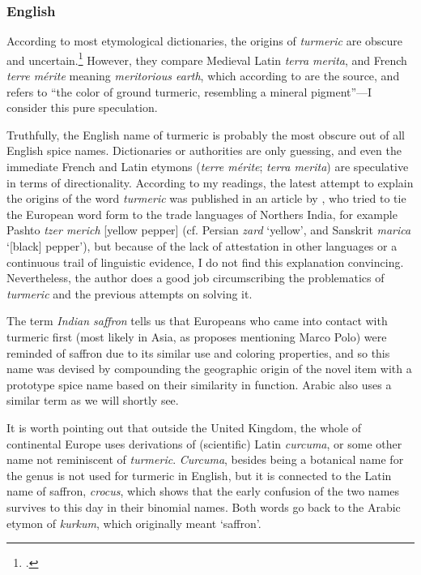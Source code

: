 \subsubsection{English}



According to most etymological dictionaries, the origins of \textit{turmeric} are obscure and uncertain.\footcites[turmeric]{oed}[turmeric]{oe}[turmeric]{ahd} However, they compare Medieval Latin \textit{terra merita}, and French \textit{terre mérite} meaning \textit{meritorious earth}, which according to \textcite[2]{nair_turmeric_2019} are the source, and refers to ``the color of ground turmeric, resembling a mineral pigment''---I consider this pure speculation. 

Truthfully, the English name of turmeric is probably the most obscure out of all English spice names. Dictionaries or authorities are only guessing, and even the immediate French and Latin etymons (\textit{terre mérite}; \textit{terra merita}) are speculative in terms of directionality. According to my readings, the latest attempt to explain the origins of the word \textit{turmeric} was published in an article by \textcite{guthrie_trade-language_2009}, who tried to tie the European word form to the trade languages of Northers India, for example Pashto \textit{tzer merich} [yellow pepper] (cf. Persian \textit{zard} `yellow', and Sanskrit \textit{marica} `[black] pepper'), but because of the lack of attestation in other languages or a continuous trail of linguistic evidence, I do not find this explanation convincing. Nevertheless, the author does a good job circumscribing the problematics of \textit{turmeric} and the previous attempts on solving it.

The term \textit{Indian saffron} tells us that Europeans who came into contact with turmeric first (most likely in Asia, as \textcite{nair_turmeric_2019} proposes mentioning Marco Polo) were reminded of saffron due to its similar use and coloring properties, and so this name was devised by compounding the geographic origin of the novel item with a prototype spice name based on their similarity in function. Arabic also uses a similar term as we will shortly see. 

It is worth pointing out that outside the United Kingdom, the whole of continental Europe uses derivations of (scientific) Latin \textit{curcuma}, or some other name not reminiscent of \textit{turmeric}. \textit{Curcuma}, besides being a botanical name for the genus is not used for turmeric in English, but it is connected to the Latin name of saffron, \textit{crocus}, which shows that the early confusion of the two names survives to this day in their binomial names. Both words go back to the Arabic etymon of \textit{kurkum}, which originally meant `saffron'.

